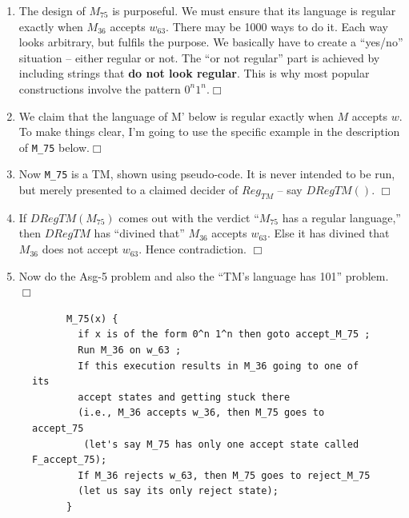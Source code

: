 \documentclass[10pt]{article}
\begin{document}
\begin{enumerate}
\item The design of $M_{75}$ is purposeful. We must ensure that
  its language is regular exactly when $M_{36}$ accepts $w_{63}$.
  There may be 1000 ways to do it. Each way looks arbitrary, but
  fulfils the purpose.
  We basically have to create a ``yes/no'' situation -- either regular
  or not.
  The ``or not regular'' part is achieved by including strings
  that {\bf do not look regular}.
  This is why most popular constructions involve the pattern
  $0^n 1^n$.\hfill$\Box$

\item We claim that the language of M' below is regular exactly
  when $M$ accepts $w$. To make things clear, I'm going to use
  the   specific example in the description of \verb|M_75| below.\hfill$\Box$
  
\item Now \verb|M_75| is a TM, shown using pseudo-code.  It is
  never intended to be run, but merely presented to a claimed
  decider of $Reg_{TM}$ -- say $DRegTM()$. \hfill$\Box$
  
\item If $DRegTM( M_{75} )$ comes out with the verdict
  ``$M_{75}$ has a regular language,'' then $DRegTM$ has ``divined that''
  $M_{36}$ accepts $w_{63}$. Else it has divined that
  $M_{36}$ does not accept $w_{63}$.  Hence contradiction.  \hfill$\Box$
\item Now do the Asg-5 problem and also the ``TM's language has 101''
  problem.\hfill$\Box$
\end{enumerate}



\begin{figure}[hbp]  
\begin{footnotesize}
    \begin{verbatim}
      M_75(x) {
        if x is of the form 0^n 1^n then goto accept_M_75 ;
        Run M_36 on w_63 ;
        If this execution results in M_36 going to one of its
        accept states and getting stuck there
        (i.e., M_36 accepts w_36, then M_75 goes to accept_75
         (let's say M_75 has only one accept state called F_accept_75);
        If M_36 rejects w_63, then M_75 goes to reject_M_75
        (let us say its only reject state);
      }
    \end{verbatim}
\end{footnotesize}
\end{figure}
\end{document}
